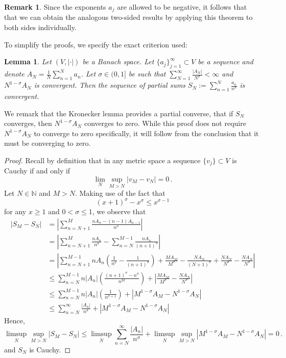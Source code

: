 \documentclass[11pt, oneside]{amsart}   	%
\newcommand{\1}{\mathbbm{1}}
\newcommand{\N}{\mathbb{N}}
\newtheorem{lemma}[theorem]{Lemma}
\theoremstyle{definition}
\newtheorem{remark}[theorem]{Remark}
\begin{document}
\begin{remark}
Since the exponents $a_j$ are allowed to be negative, it follows that that we can obtain the analogous two-sided results by applying this theorem to both sides individually.
\end{remark}




To simplify the proofs, we specify the exact criterion used:



\begin{lemma}\label{L:HilbertCriterion}
Let $(V, | \cdot |)$ be a Banach space. Let $\{a_j\}_{j=1}^\infty \subset V$ be a sequence and denote $A_N = \frac{1}{N}\sum_{n=1}^N a_n$. Let $\sigma \in (0, 1]$ be such that $\sum_{N=1}^\infty \frac{|A_N|}{N^\sigma} < \infty$ and $N^{1-\sigma}A_N$ is convergent. Then the sequence of partial sums $S_N := \sum_{n=1}^N \frac{a_n}{n^\sigma}$ is convergent.
\end{lemma}
We remark that the Kronecker lemma provides a partial converse, that if $S_N$ converges, then $N^{1-\sigma}A_N$ converges to zero. While this proof does not require $N^{1-\sigma}A_N$ to converge to zero specifically, it will follow from the conclusion that it must be converging to zero.

\begin{proof}
Recall by definition that in any metric space a sequence $\{v_j\} \subset V$ is Cauchy if and only if
$$\lim_{N} \sup_{M > N} |v_M - v_N| = 0 \, .$$
Let $N\in \N$ and $M > N$. Making use of the fact that
$$(x+1)^\sigma - x^\sigma \leq x^{\sigma - 1}$$
for any $x\geq1$ and $0 < \sigma \leq 1$, we observe that
\begin{align*}
 \left| S_{M} - S_{N}\right| &= \left|\sum_{n=N+1}^M \frac{nA_n - (n-1)A_{n-1}}{n^\sigma}\right| \\
&= \left|\sum_{n=N+1}^M \frac{nA_n}{n^\sigma} - \sum_{n=N}^{M-1} \frac{nA_n}{(n+1)^\sigma}\right| \\
&= \left|\sum_{n=N+1}^{M-1} nA_n\left(\frac{1}{n^\sigma} - \frac{1}{(n+1)^\sigma}\right) + \frac{MA_M}{M^\sigma} - \frac{NA_N} {(N+1)^\sigma} + \frac{NA_N}{N^\sigma} - \frac{NA_N}{N^\sigma}\right| \\
&\leq \sum_{n=N}^{M-1} n|A_n|\left(\frac{(n+1)^\sigma - n^\sigma}{n^{2\sigma}}\right) + \left|\frac{MA_M}{M^\sigma} - \frac{NA_N}{N^\sigma}\right| \\
&\leq \sum_{n=N}^{M-1} n|A_n|\left(\frac{1}{n^{\sigma + 1}}\right) + \left|M^{1-\sigma}A_M - N^{1-\sigma}A_N\right| \\
&\leq \sum_{n=N}^{\infty} \frac{|A_n|}{n^\sigma} + \left|M^{1-\sigma}A_M - N^{1-\sigma}A_N\right|
\end{align*}
Hence,
$$\limsup_N \sup_{M > N}\left| S_{M} - S_{N}\right| \leq \limsup_N \sum_{n=N}^{\infty} \frac{|A_n|}{n^\sigma} + \limsup_N \sup_{M > N} \left|M^{1-\sigma}A_M - N^{1-\sigma}A_N\right| = 0\, .$$
and $S_N$ is Cauchy.
\end{proof}
\end{document}
